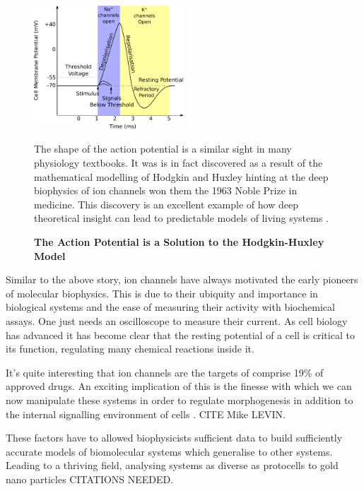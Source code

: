 \begin{figure}
	\begin{center}
		\includegraphics[width=0.5\textwidth]{figures/Hodgkin-Huxley_action_potential.pdf}
	\end{center}
	\captionsetup{singlelinecheck = false, justification=raggedright}
	\caption[The Action Potential is a Solution to the Hodkin-Huxley Model] {\textbf{The Action Potential is a Solution to the Hodgkin-Huxley Model }}{The shape of the action potential is a similar sight in many physiology textbooks. It was is in fact discovered as a result of the mathematical modelling of Hodgkin and Huxley hinting at the deep biophysics of ion channels won them the 1963 Noble Prize in medicine. This discovery is an excellent example of how deep theoretical insight can lead to predictable models of living systems \cite{hodgkin1952}\cite{hodgkin1952a}\cite{hodgkin1952b}\cite{hodgkin1952c}\cite{hodgkin1952d}\cite{hodgkin1952e}.}
	\label{action_potential_graphic}
\end{figure}

Similar to the above story, ion channels have always motivated the early pioneers of molecular biophysics. This is due to their ubiquity and importance in biological systems and the ease of measuring their activity with biochemical assays. One just needs an oscilloscope to measure their current. As cell biology has advanced it has become clear that the resting potential of a cell is critical to its function, regulating many chemical reactions inside it.

It's quite interesting that ion channels are the targets of comprise 19\% of approved drugs.\cite{santos2017} An exciting implication of this is the finesse with which we can now manipulate these systems in order to regulate morphogenesis in addition to the internal signalling environment of cells \cite{}. CITE Mike LEVIN.

These factors have to allowed biophysicists sufficient data to build sufficiently accurate models of biomolecular systems which generalise to other systems. Leading to a thriving field, analysing systems as diverse as protocells to gold nano particles CITATIONS NEEDED.

